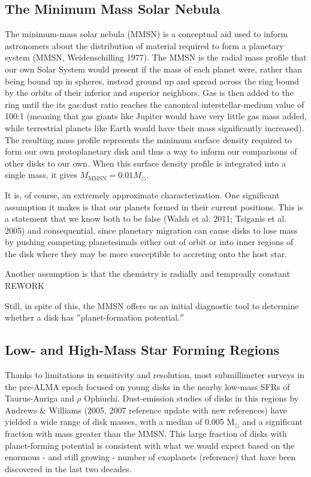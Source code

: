 \subsection{The Minimum Mass Solar Nebula}

The minimum-mass solar nebula (MMSN) is a conceptual aid used to inform astronomers about the distribution of material required to form a planetary system (MMSN, Weidenschilling 1977). The MMSN is the radial mass profile that our own Solar System would present if the mass of each planet were, rather than being bound up in spheres, instead ground up and spread across the ring bound by the orbits of their inferior and superior neighbors. Gas is then added to the ring until the its gas:dust ratio reaches the canonical interstellar-medium value of 100:1 (meaning that gas giants like Jupiter would have very little gas mass added, while terrestrial planets like Earth would have their mass significantly increased). The resulting mass profile represents the minimum surface density required to form our own protoplanetary disk and thus a way to inform our comparisons of other disks to our own. When this surface density profile is integrated into a single mass, it gives $M_\text{MMSN} = 0.01 M_{\odot}$.

It is, of course, an extremely approximate characterization. One significant assumption it makes is that our planets formed in their current positions. This is a statement that we know both to be false (Walsh et al. 2011; Tsiganis et al. 2005) and consequential, since planetary migration can cause disks to lose mass by pushing competing planetesimals either out of orbit or into inner regions of the disk where they may be more susceptible to accreting onto the host star.

Another assumption is that the chemistry is radially and temproally constant REWORK


 Still, in spite of this, the MMSN offers us an initial diagnostic tool to determine whether a disk has $''$planet-formation potential.$''$


\subsection{Low- and High-Mass Star Forming Regions}
Thanks to limitations in sensitivity and resolution, most submillimeter surveys in the pre-ALMA epoch focused on young disks in the nearby low-mass SFRs of Taurus-Auriga and $\rho$ Ophiuchi. Dust-emission studies of disks in this regions by Andrews \& Williams (2005, 2007 reference update with new references) have yielded a wide range of disk masses, with a median of 0.005 M$_{\odot}$ and a significant fraction with mass greater than the MMSN. This large fraction of disks with planet-forming potential is consistent with what we would expect based on the enormous - and still growing - number of exoplanets (reference) that have been discovered in the last two decades.


